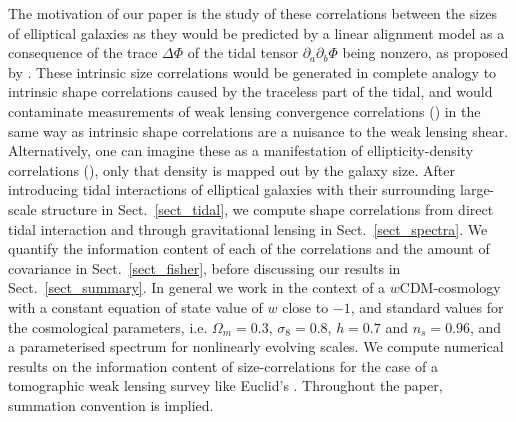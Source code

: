 \documentclass[a4paper,fleqn,usenatbib]{mnras}
\begin{document}
The motivation of our paper is the study of these correlations between the sizes of elliptical galaxies as they would be predicted by a linear alignment model as a consequence of the trace $\Delta\Phi$ of the tidal tensor $\partial_a\partial_b\Phi$ being nonzero, as proposed by \citet{hirata_galaxy-galaxy_2004, hirata_intrinsic_2010}. These intrinsic size correlations would be generated in complete analogy to intrinsic shape correlations caused by the traceless part of the tidal, and would contaminate measurements of weak lensing convergence correlations (\cite{alsing_weak_2014}) in the same way as intrinsic shape correlations are a nuisance to the weak lensing shear. Alternatively, one can imagine these as a manifestation of ellipticity-density correlations (\cite{2002astro.ph..5512H}), only that density is mapped out by the galaxy size. After introducing tidal interactions of elliptical galaxies with their surrounding large-scale structure in Sect.~\ref{sect_tidal}, we compute shape correlations from direct tidal interaction and through gravitational lensing in Sect.~\ref{sect_spectra}. We quantify the information content of each of the correlations and the amount of covariance in Sect.~\ref{sect_fisher}, before discussing our results in Sect.~\ref{sect_summary}. In general we work in the context of a $w$CDM-cosmology with a constant equation of state value of $w$ close to $-1$, and standard values for the cosmological parameters, i.e. $\Omega_m = 0.3$, $\sigma_8 =  0.8$, $h = 0.7$ and $n_s = 0.96$, and a parameterised spectrum for nonlinearly evolving scales. We compute numerical results on the information content of size-correlations for the case of a tomographic weak lensing survey like Euclid's \cite{Amendola:2016saw}. Throughout the paper, summation convention is implied.


\end{document}
